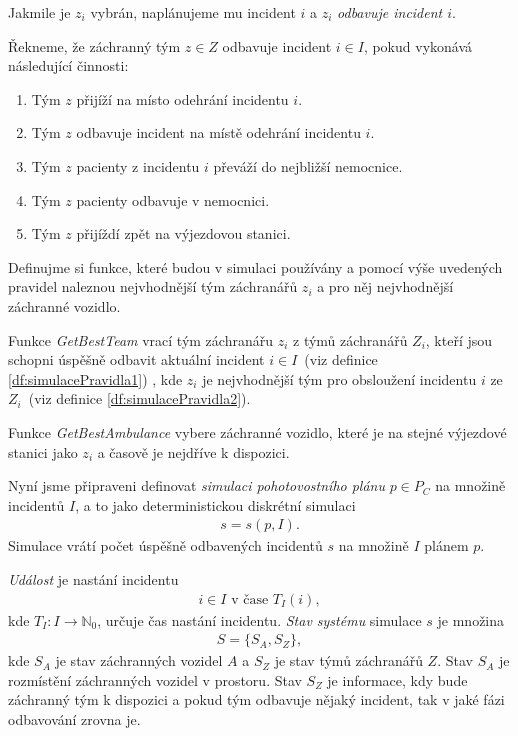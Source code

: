 Jakmile je $z_i$ vybrán, naplánujeme mu incident $i$ a $z_i$ \textit{odbavuje incident $i$}.
\begin{definice}\label{df:odbavujeIncident}
  Řekneme, že záchranný tým $z \in Z$ odbavuje incident $i \in I$, pokud vykonává následující činnosti:
  \begin{enumerate}
    \item
      Tým $z$ přijíží na místo odehrání incidentu $i$.

    \item
      Tým $z$ odbavuje incident na místě odehrání incidentu $i$.

    \item
      Tým $z$ pacienty z incidentu $i$ převáží do nejbližší nemocnice.

    \item
      Tým $z$ pacienty odbavuje v nemocnici.

    \item
      Tým $z$ přijíždí zpět na výjezdovou stanici.
  \end{enumerate}
\end{definice}
Definujme si funkce, které budou v simulaci používány a pomocí výše uvedených pravidel naleznou nejvhodnější tým záchranářů $z_i$
a pro něj nejvhodnější záchranné vozidlo.
\begin{definice}[GetBestTeam]\label{df:getBestTeam}
Funkce \textit{GetBestTeam} vrací tým záchranářu $z_i$ z týmů záchranářů $Z_i$, kteří jsou schopni úspěšně odbavit aktuální incident $i \in I$~(viz definice \ref{df:simulacePravidla1})
  , kde $z_i$ je nejvhodnější tým pro obsloužení incidentu $i$ ze $Z_i$~(viz definice \ref{df:simulacePravidla2}). 
\end{definice}
\begin{definice}[GetBestAmbulance]
Funkce \textit{GetBestAmbulance}\label{df:getBestAmbulance} vybere záchranné vozidlo, které je na stejné výjezdové stanici jako $z_i$ a časově je nejdříve k dispozici.
\end{definice}

Nyní jsme připraveni definovat \textit{simulaci pohotovostního plánu} $p \in P_C$ na množině incidentů $I$, a to jako deterministickou diskrétní simulaci
\begin{align*}
  s = s(p, I).
\end{align*}
Simulace vrátí počet úspěšně odbavených incidentů $s$ na množině $I$ plánem $p$. 

\textit{Událost} je nastání incidentu 
\begin{align*}
  i \in I \text{ v čase } T_I(i),
\end{align*}
kde $T_I \colon I \rightarrow \mathbb{N}_0$, určuje čas nastání incidentu.
\textit{Stav systému} simulace $s$ je množina
\begin{align*}
S = \{ S_A, S_Z \},
\end{align*}
kde $S_A$ je stav záchranných vozidel $A$ a $S_Z$ je stav týmů záchranářů $Z$. 
Stav $S_A$ je rozmístění záchranných vozidel v prostoru.
Stav $S_Z$ je informace, kdy bude záchranný tým k dispozici a pokud tým odbavuje nějaký incident, tak v jaké fázi odbavování zrovna je. 

